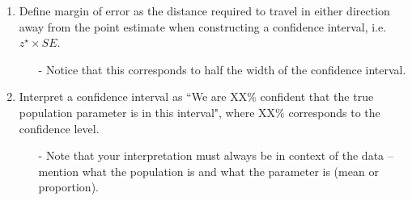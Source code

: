 \documentclass[11pt]{article}
\begin{document}
\begin{enumerate}[resume]
\item Define margin of error as the distance required to travel in either direction away from the point estimate when constructing a confidence interval, i.e. $z^{\star} \times SE$.
\begin{itemize}
\item[-] Notice that this corresponds to half the width of the confidence interval.
\end{itemize}

\item Interpret a confidence interval as ``We are XX\% confident that the true population parameter is in this interval", where XX\% corresponds to the confidence level.
\begin{itemize}
\item[-] Note that your interpretation must always be in context of the data -- mention what the population is and what the parameter is (mean or proportion).
\end{itemize}
\end{enumerate}
\end{document}
